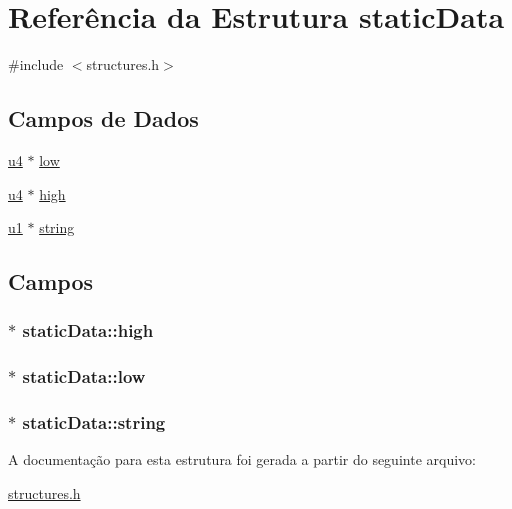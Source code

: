 \hypertarget{structstaticData}{}\section{Referência da Estrutura static\+Data}
\label{structstaticData}


{\ttfamily \#include $<$structures.\+h$>$}

\subsection*{Campos de Dados}
\begin{DoxyCompactItemize}
\item 
\hyperlink{lista__operandos_8h_ae5be1f726785414dd1b77d60df074c9d}{u4} $\ast$ \hyperlink{structstaticData_a6c801d8dfb13f581177419b886e185b7}{low}
\item 
\hyperlink{lista__operandos_8h_ae5be1f726785414dd1b77d60df074c9d}{u4} $\ast$ \hyperlink{structstaticData_aa3c83f5bbc55031a056065c2a84b3b3a}{high}
\item 
\hyperlink{lista__operandos_8h_ad9f4cdb6757615aae2fad89dab3c5470}{u1} $\ast$ \hyperlink{structstaticData_a62892ba25aa5ac67cb46d49e82447f86}{string}
\end{DoxyCompactItemize}


\subsection{Campos}
\subsubsection[{\texorpdfstring{high}{high}}]{$\ast$ static\+Data\+::high}\hypertarget{structstaticData_aa3c83f5bbc55031a056065c2a84b3b3a}{}\label{structstaticData_aa3c83f5bbc55031a056065c2a84b3b3a}
\subsubsection[{\texorpdfstring{low}{low}}]{$\ast$ static\+Data\+::low}\hypertarget{structstaticData_a6c801d8dfb13f581177419b886e185b7}{}\label{structstaticData_a6c801d8dfb13f581177419b886e185b7}
\subsubsection[{\texorpdfstring{string}{string}}]{$\ast$ static\+Data\+::string}\hypertarget{structstaticData_a62892ba25aa5ac67cb46d49e82447f86}{}\label{structstaticData_a62892ba25aa5ac67cb46d49e82447f86}


A documentação para esta estrutura foi gerada a partir do seguinte arquivo\+:\begin{DoxyCompactItemize}
\item 
\hyperlink{structures_8h}{structures.\+h}\end{DoxyCompactItemize}
